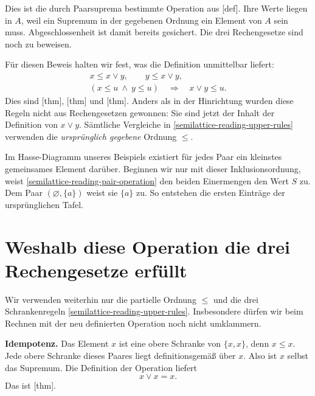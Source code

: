 Dies ist die durch Paarsuprema bestimmte Operation aus
[def]. Ihre Werte liegen in
\(A\), weil ein Supremum in der gegebenen Ordnung ein Element
von \(A\) sein muss. Abgeschlossenheit ist damit bereits gesichert.
Die drei Rechengesetze sind noch zu beweisen.

Für diesen Beweis halten wir fest, was die Definition unmittelbar
liefert:
\begin{equation}
  \begin{gathered}
    x\leq x\vee y,\qquad y\leq x\vee y,\\
    (x\leq u\ \land\ y\leq u)
      \quad\Longrightarrow\quad x\vee y\leq u.
  \end{gathered}
  \tag{U}\label{semilattice-reading-upper-rules}
\end{equation}
Dies sind [thm],
[thm] und
[thm]. Anders als in der
Hinrichtung wurden diese Regeln nicht aus Rechengesetzen gewonnen:
Sie sind jetzt der Inhalt der Definition von \(x\vee y\).
Sämtliche Vergleiche in \eqref{semilattice-reading-upper-rules}
verwenden die \emph{ursprünglich gegebene} Ordnung \(\leq\).

Im Hasse-Diagramm unseres Beispiels existiert für jedes Paar ein
kleinstes gemeinsames Element darüber. Beginnen wir nur mit dieser
Inklusionsordnung, weist \eqref{semilattice-reading-pair-operation}
den beiden Einermengen den Wert \(S\) zu. Dem Paar
\((\varnothing,\{a\})\) weist sie \(\{a\}\) zu.
So entstehen die ersten Einträge der ursprünglichen Tafel.

\par{}
\section*{Weshalb diese Operation die drei Rechengesetze erfüllt}
\hypertarget{semilattice.reading.associativity}{}

Wir verwenden weiterhin nur die partielle Ordnung \(\leq\)
und die drei Schrankenregeln
\eqref{semilattice-reading-upper-rules}. Insbesondere dürfen
wir beim Rechnen mit der neu definierten Operation noch nicht
umklammern.

\medskip\noindent\textbf{Idempotenz.}
Das Element \(x\) ist eine obere Schranke von \(\{x,x\}\),
denn \(x\leq x\). Jede obere Schranke dieses Paares liegt
definitionsgemäß über \(x\). Also ist \(x\) selbst das
Supremum. Die Definition der Operation liefert
\[
  x\vee x=x.
\]
Das ist [thm].

